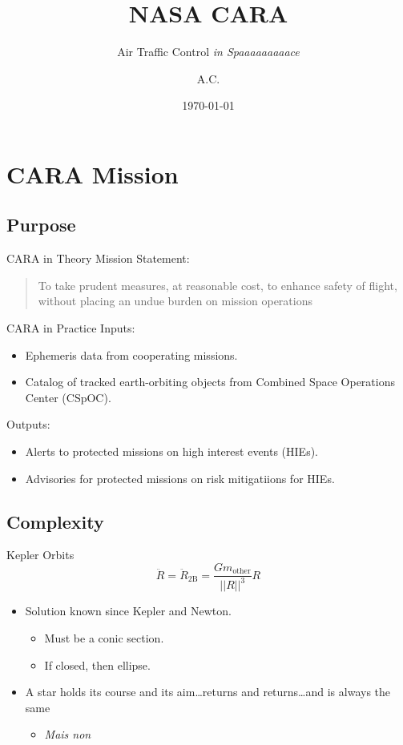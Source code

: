 \documentclass[pdf]{beamer}
\title{NASA CARA}
\subtitle{Air Traffic Control \emph{in Spaaaaaaaaace}}
\author{A.C.}
\date{\today}
\begin{document}
\begin{frame}
  \titlepage
\end{frame}

\section{CARA Mission}
\subsection{Purpose}
\begin{frame}{CARA in Theory}
  Mission Statement:
  \begin{quote}
    To take prudent measures, at reasonable cost, to enhance safety of flight,
    without placing an undue burden on mission operations
  \end{quote}
\end{frame}

\begin{frame}{CARA in Practice}
  Inputs:
  \begin{itemize}
  \item Ephemeris data from cooperating missions.
  \item Catalog of tracked earth-orbiting objects from Combined Space Operations
    Center (CSpOC).
  \end{itemize}

  Outputs:
  \begin{itemize}
  \item Alerts to protected missions on high interest events (HIEs).
  \item Advisories for protected missions on risk mitigatiions for HIEs.
  \end{itemize}
\end{frame}

\subsection{Complexity}
\begin{frame}{Kepler Orbits}
  \[ \ddot{R} = \ddot{R}_\text{2B} = \frac{Gm_\text{other}}{||R||^3}R \]

  \begin{itemize}
  \item Solution known since Kepler and Newton.
    \begin{itemize}
    \item Must be a conic section.
    \item If closed, then ellipse.
    \end{itemize}
  \item A star holds its course and its aim\ldots returns and returns\ldots and is always the same
    \begin{itemize}
    \item \textit{Mais non}
    \end{itemize}
  \end{itemize}
\end{frame}
\end{document}
